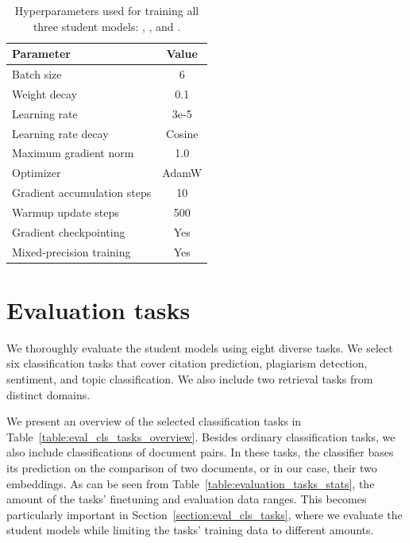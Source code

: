 \begin{table}
  \centering
  \footnotesize

  \begin{tabular}{l c}
    \toprule
    Parameter & Value \\
    \midrule
    Batch size & 6 \\
    Weight decay & 0.1 \\
    Learning rate & 3e-5 \\
    Learning rate decay & Cosine \\
    Maximum gradient norm & 1.0 \\
    Optimizer & AdamW \\
    Gradient accumulation steps & 10 \\
    Warmup update steps & 500\\
    Gradient checkpointing & Yes \\
    Mixed-precision training & Yes \\
    \bottomrule
  \end{tabular}

  \caption{Hyperparameters used for training all three student models:
  {\CosineStudent}, {\MSEStudent}, and {\OnlyMSEStudent}.}

  \label{table:final_student_train_params}

\end{table}

\section{Evaluation tasks}

We thoroughly evaluate the student models using eight diverse tasks. We
select six classification tasks that cover citation prediction, plagiarism
detection, sentiment, and topic classification. We also include two retrieval
tasks from distinct domains.

We present an overview of the selected classification tasks in
Table~\ref{table:eval_cls_tasks_overview}. Besides ordinary classification
tasks, we also include classifications of document pairs. In these tasks,
the classifier bases its prediction on the comparison of two documents, or in
our case,  their two embeddings. As can be seen from
Table~\ref{table:evaluation_tasks_stats}, the amount of the tasks' finetuning
and evaluation data ranges. This becomes particularly important in
Section~\ref{section:eval_cls_tasks}, where we evaluate the student models
while limiting the tasks' training data to different amounts.


